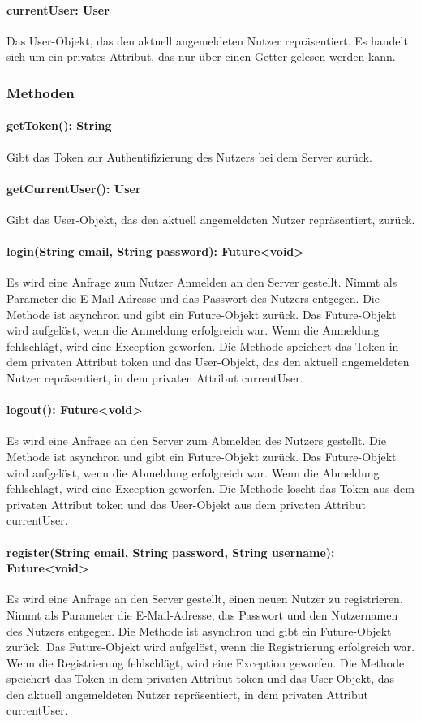 \documentclass[parskip=full]{scrartcl}
\begin{document}
\paragraph{currentUser: User}
Das User-Objekt, das den aktuell angemeldeten Nutzer repräsentiert. Es handelt sich um ein privates Attribut, das nur über einen Getter gelesen werden kann.
\subsubsection{Methoden}
\paragraph{getToken(): String}
Gibt das Token zur Authentifizierung des Nutzers bei dem Server zurück.
\paragraph{getCurrentUser(): User}
Gibt das User-Objekt, das den aktuell angemeldeten Nutzer repräsentiert, zurück.
\paragraph{login(String email, String password): Future<void>}
Es wird eine Anfrage zum Nutzer Anmelden an den Server gestellt. Nimmt als Parameter die E-Mail-Adresse und das Passwort des Nutzers entgegen. Die Methode ist asynchron und gibt ein Future-Objekt zurück. Das Future-Objekt wird aufgelöst, wenn die Anmeldung erfolgreich war. Wenn die Anmeldung fehlschlägt, wird eine Exception geworfen. Die Methode speichert das Token in dem privaten Attribut token und das User-Objekt, das den aktuell angemeldeten Nutzer repräsentiert, in dem privaten Attribut currentUser.
\paragraph{logout(): Future<void>}
Es wird eine Anfrage an den Server zum Abmelden des Nutzers gestellt. Die Methode ist asynchron und gibt ein Future-Objekt zurück. Das Future-Objekt wird aufgelöst, wenn die Abmeldung erfolgreich war. Wenn die Abmeldung fehlschlägt, wird eine Exception geworfen. Die Methode löscht das Token aus dem privaten Attribut token und das User-Objekt aus dem privaten Attribut currentUser.
\paragraph{register(String email, String password, String username): Future<void>}
Es wird eine Anfrage an den Server gestellt, einen neuen Nutzer zu registrieren. Nimmt als Parameter die E-Mail-Adresse, das Passwort und den Nutzernamen des Nutzers entgegen. Die Methode ist asynchron und gibt ein Future-Objekt zurück. Das Future-Objekt wird aufgelöst, wenn die Registrierung erfolgreich war. Wenn die Registrierung fehlschlägt, wird eine Exception geworfen. Die Methode speichert das Token in dem privaten Attribut token und das User-Objekt, das den aktuell angemeldeten Nutzer repräsentiert, in dem privaten Attribut currentUser.
\end{document}
